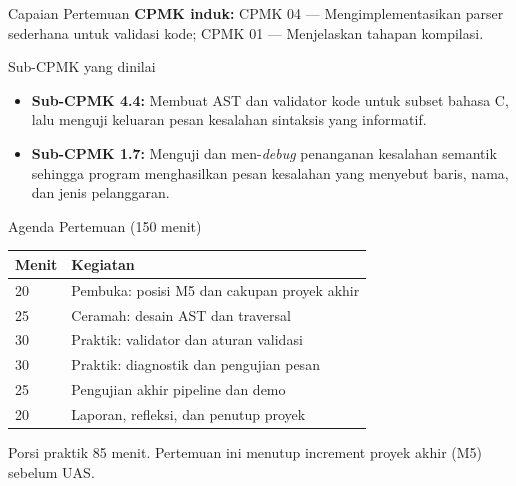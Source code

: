 \documentclass[aspectratio=169,10pt,t]{beamer}
\begin{document}

\begin{frame}{Capaian Pertemuan}
  \textbf{CPMK induk:} CPMK 04 --- Mengimplementasikan parser sederhana
  untuk validasi kode; CPMK 01 --- Menjelaskan tahapan kompilasi.

  \vspace{2pt}
  \begin{block}{Sub-CPMK yang dinilai}
    \footnotesize
    \begin{itemize}
      \setlength{\itemsep}{1pt}
      \item \textbf{Sub-CPMK 4.4:} Membuat AST dan validator kode
            untuk subset bahasa C, lalu menguji keluaran pesan
            kesalahan sintaksis yang informatif.
      \item \textbf{Sub-CPMK 1.7:} Menguji dan men-\textit{debug}
            penanganan kesalahan semantik sehingga program menghasilkan
            pesan kesalahan yang menyebut baris, nama, dan jenis
            pelanggaran.
    \end{itemize}
  \end{block}
\end{frame}

\begin{frame}{Agenda Pertemuan (150 menit)}
  \small
  \begin{tabular}{@{}p{1.4cm}p{12.3cm}@{}}
    \toprule
    \textbf{Menit} & \textbf{Kegiatan} \\
    \midrule
    20 & Pembuka: posisi M5 dan cakupan proyek akhir \\
    25 & Ceramah: desain AST dan traversal \\
    30 & Praktik: validator dan aturan validasi \\
    30 & Praktik: diagnostik dan pengujian pesan \\
    25 & Pengujian akhir pipeline dan demo \\
    20 & Laporan, refleksi, dan penutup proyek \\
    \bottomrule
  \end{tabular}

  \vspace{6pt}
  {\scriptsize\color{ubbblue!75}Porsi praktik 85 menit. Pertemuan ini
  menutup increment proyek akhir (M5) sebelum UAS.}
\end{frame}
\end{document}
